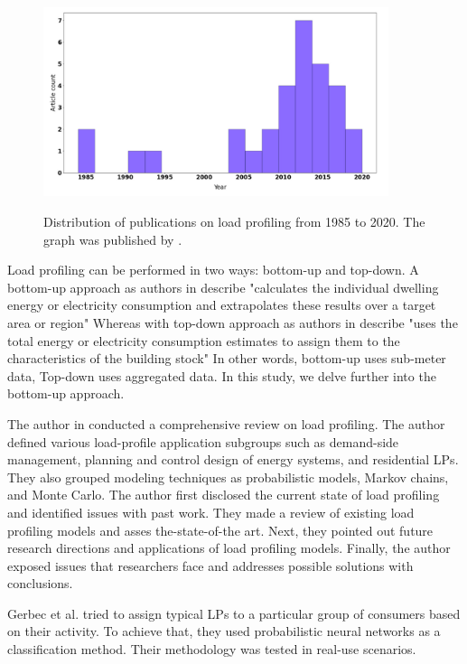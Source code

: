 \begin{figure}[H]
	\centering
	\caption{Distribution of publications on load profiling from 1985 to 2020. The graph was published by \protect\cite{Review2021}.}
	\includegraphics[width=0.9\textwidth]{Figures/publications.png}
	\label{fig:Distribution}
\end{figure}

Load profiling can be performed in two ways: bottom-up and top-down. 
A bottom-up approach as authors in \cite{SWAN20091819} describe "calculates the individual dwelling energy or electricity consumption and extrapolates these results over a target area or region"
Whereas with top-down approach as authors in \cite{SWAN20091819} describe "uses the total energy or electricity consumption estimates to assign them to the characteristics of the building stock"
In other words, bottom-up uses sub-meter data, Top-down uses aggregated data. 
In this study, we delve further into the bottom-up approach.

The author in \cite{Review2021} conducted a comprehensive review on load profiling. 
The author defined various load-profile application subgroups such as demand-side management, planning and control design of energy systems, and residential LPs. 
They also grouped modeling techniques as probabilistic models, Markov chains, and Monte Carlo. 
The author first disclosed the current state of load profiling and identified issues with past work.
They made a review of existing load profiling models and asses the-state-of-the art. 
Next, they pointed out future research directions and applications of load profiling models. 
Finally, the author exposed issues that researchers face and addresses possible solutions with conclusions.

Gerbec et al.\cite{GERBEC2005} tried to assign typical LPs to a particular group of consumers based on their activity. 
To achieve that, they used probabilistic neural networks as a classification method.
Their methodology was tested in real-use scenarios. 

